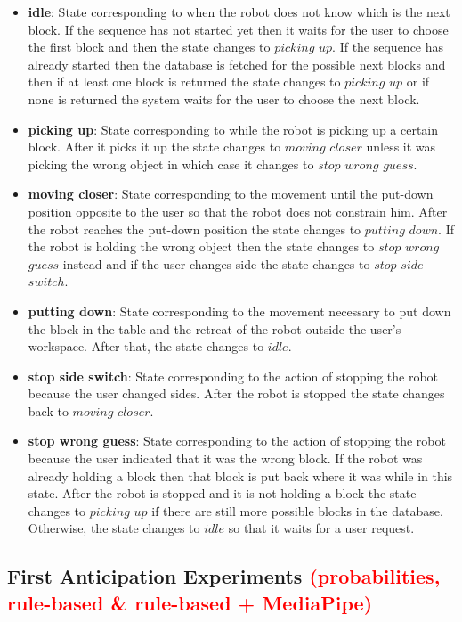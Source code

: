 \begin{itemize}
    \item \textbf{idle}: State corresponding to when the robot does not know which is the next block. If the sequence has not started yet then it waits for the user to choose the first block and then the state changes to $picking$ $up$. If the sequence has already started then the database is fetched for the possible next blocks and then if at least one block is returned the state changes to $picking$ $up$ or if none is returned the system waits for the user to choose the next block.
    \item \textbf{picking up}: State corresponding to while the robot is picking up a certain block. After it picks it up the state changes to $moving$ $closer$ unless it was picking the wrong object in which case it changes to $stop$ $wrong$ $guess$.
    \item \textbf{moving closer}: State corresponding to the movement until the put-down position opposite to the user so that the robot does not constrain him. After the robot reaches the put-down position the state changes to $putting$ $down$. If the robot is holding the wrong object then the state changes to $stop$ $wrong$ $guess$ instead and if the user changes side the state changes to $stop$ $side$ $switch$.
    \item \textbf{putting down}: State corresponding to the movement necessary to put down the block in the table and the retreat of the robot outside the user's workspace. After that, the state changes to $idle$.
    \item \textbf{stop side switch}: State corresponding to the action of stopping the robot because the user changed sides. After the robot is stopped the state changes back to $moving$ $closer$.
    \item \textbf{stop wrong guess}: State corresponding to the action of stopping the robot because the user indicated that it was the wrong block. If the robot was already holding a block then that block is put back where it was while in this state. After the robot is stopped and it is not holding a block the state changes to $picking$ $up$ if there are still more possible blocks in the database. Otherwise, the state changes to $idle$ so that it waits for a user request.
\end{itemize}

\subsection{First Anticipation Experiments \textcolor{red}{(probabilities, rule-based \& rule-based + MediaPipe)}}

